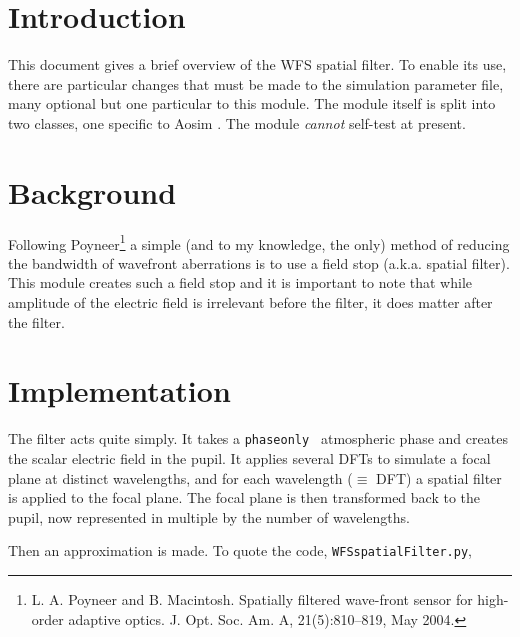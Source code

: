 \documentclass{article}
\begin{document}

\renewcommand{\dasptitle}{WFS Spatial Filter}
\renewcommand{\daspauthorname}{Nazim Bharmal}
\renewcommand{\daspdocno}{AOSIM-???-???-???}
\renewcommand{\releasedate}{2013/06/30}


\section{Introduction}

This document gives a brief overview of the WFS spatial filter. To enable
its use, there are particular changes that must be made to the simulation
parameter file, many optional but one particular to this module. The module
itself is split into two classes, one specific to {\sc Aosim }. The module
{\em cannot} self-test at present.

\section{Background}

Following Poyneer\footnote{L. A. Poyneer and B. Macintosh. Spatially ﬁltered
wave-front sensor for high-order adaptive optics. J.  Opt. Soc. Am. A,
21(5):810–819, May 2004.} a simple (and to my knowledge, the only) method of
reducing the bandwidth of wavefront aberrations is to use a field stop (a.k.a.
spatial filter). This module creates such a field stop and it is important to
note that while amplitude of the electric field is irrelevant before the
filter, it does matter after the filter.

\section{Implementation}

The filter acts quite simply. It takes a {\tt phaseonly } atmospheric phase
and creates the scalar electric field in the pupil. It applies several DFTs
to simulate a focal plane at distinct wavelengths, and for each wavelength
($\equiv$ DFT) a spatial filter is applied to the focal plane. The
focal plane is then transformed back to the pupil, now represented in
multiple by the number of wavelengths.

Then an approximation is made. To quote the code, {\tt WFSspatialFilter.py},
\end{document}
